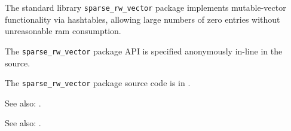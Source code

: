 
The standard library {\tt sparse\_rw\_vector} package implements mutable-vector functionality 
via hashtables, allowing large numbers of zero entries without unreasonable ram consumption.

The {\tt sparse\_rw\_vector} package API is specified anonymously in-line in the source.

The {\tt sparse\_rw\_vector} package source code is in .

See also:  .

See also:  .

